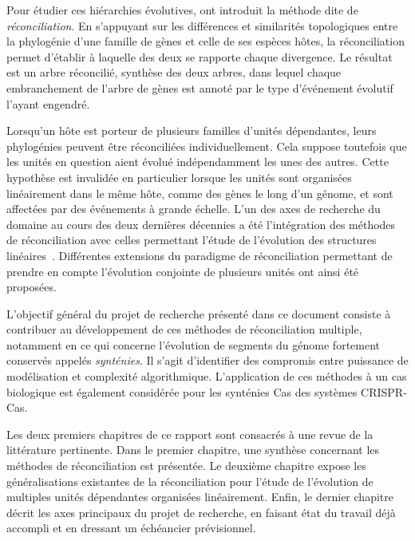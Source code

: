 Pour étudier ces hiérarchies évolutives, \textcite{Goodman1979FittingGeneLineage} ont introduit la méthode dite de \emph{réconciliation}.
En s’appuyant sur les différences et similarités topologiques entre la phylogénie d’une famille de gènes et celle de ses espèces hôtes, la réconciliation permet d’établir à laquelle des deux se rapporte chaque divergence.
Le résultat est un arbre réconcilié, synthèse des deux arbres, dans lequel chaque embranchement de l’arbre de gènes est annoté par le type d’événement évolutif l’ayant engendré.

Lorsqu’un hôte est porteur de plusieurs familles d’unités dépendantes, leurs phylogénies peuvent être réconciliées individuellement.
Cela suppose toutefois que les unités en question aient évolué indépendamment les unes des autres.
Cette hypothèse est invalidée en particulier lorsque les unités sont organisées linéairement dans le même hôte, comme des gènes le long d’un génome, et sont affectées par des événements à grande échelle.
L’un des axes de recherche du domaine au cours des deux dernières décennies a été l’intégration des méthodes de réconciliation avec celles permettant l’étude de l’évolution des structures linéaires~\parencite{Sankoff2000DuplicationRearrangementReconciliation}.
Différentes extensions du paradigme de réconciliation permettant de prendre en compte l’évolution conjointe de plusieurs unités ont ainsi été proposées.

L’objectif général du projet de recherche présenté dans ce document consiste à contribuer au développement de ces méthodes de réconciliation multiple, notamment en ce qui concerne l’évolution de segments du génome fortement conservés appelés \emph{synténies}.
Il s’agit d’identifier des compromis entre puissance de modélisation et complexité algorithmique.
L’application de ces méthodes à un cas biologique est également considérée pour les synténies Cas des systèmes CRISPR-Cas.

Les deux premiers chapitres de ce rapport sont consacrés à une revue de la littérature pertinente.
Dans le premier chapitre, une synthèse concernant les méthodes de réconciliation est présentée.
Le deuxième chapitre expose les généralisations existantes de la réconciliation pour l’étude de l’évolution de multiples unités dépendantes organisées linéairement.
Enfin, le dernier chapitre décrit les axes principaux du projet de recherche, en faisant état du travail déjà accompli et en dressant un échéancier prévisionnel.

